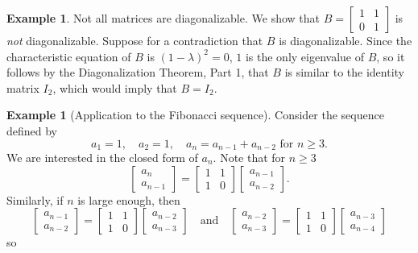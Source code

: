 \documentclass[12pt,letterpaper]{book}
\numberwithin{equation}{section}
\theoremstyle{definition}
\newtheorem{example}[thm]{\textbf{Example}}
\begin{document}
\begin{example} Not all matrices are diagonalizable. We show that $B=\left[\begin{array}{rr} 1 & 1 \\
0 & 1
\end{array}\right]$ is \textit{not} diagonalizable. Suppose for a contradiction that $B$ is diagonalizable. Since the characteristic equation of $B$ is $(1-\lambda)^2=0$, $1$ is the only eigenvalue of $B$, so it follows by the Diagonalization Theorem, Part 1, that $B$ is similar to the identity matrix $I_2$, which would imply that $B=I_2$.
\end{example}

\begin{example}[Application to the Fibonacci sequence] Consider the
sequence defined by $$a_1=1,\quad a_2=1,\quad
a_{n}=a_{n-1}+a_{n-2}\text{ for }n\geq 3.$$ We are interested in the
closed form of $a_n$. Note that for $n\geq 3$
$$\left[\begin{array}{c} a_{n} \\
a_{n-1} \end{array}\right]=\left[\begin{array}{rr} 1 & 1  \\
1 & 0 \end{array}\right]\left[\begin{array}{c} a_{n-1} \\
a_{n-2} \end{array}\right].$$ Similarly, if $n$ is large enough,
then
$$\left[\begin{array}{c} a_{n-1} \\
a_{n-2} \end{array}\right]=\left[\begin{array}{rr} 1 & 1  \\
1 & 0 \end{array}\right]\left[\begin{array}{c} a_{n-2} \\
a_{n-3} \end{array}\right]\quad\text{and}\quad \left[\begin{array}{c} a_{n-2} \\
a_{n-3} \end{array}\right]=\left[\begin{array}{rr} 1 & 1  \\
1 & 0 \end{array}\right]\left[\begin{array}{c} a_{n-3} \\
a_{n-4} \end{array}\right]$$ so

\end{example}
\end{document}
